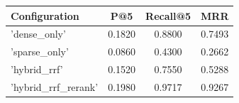 \begin{tabular}{lccc}
\hline
Configuration & P@5 & Recall@5 & MRR \\
\hline
'dense_only' & 0.1820 & 0.8800 & 0.7493 \\
'sparse_only' & 0.0860 & 0.4300 & 0.2662 \\
'hybrid_rrf' & 0.1520 & 0.7550 & 0.5288 \\
'hybrid_rrf_rerank' & 0.1980 & 0.9717 & 0.9267 \\
\hline
\end{tabular}
